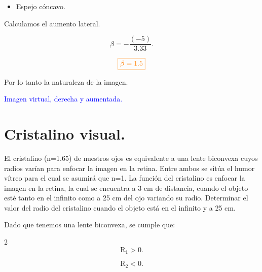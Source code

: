 \documentclass[a4paper,12pt]{article} %
\begin{document}
\vspace{\baselineskip}

\begin{itemize}
	\item Espejo cóncavo.
\end{itemize}

\begin{justify}
	Calculamos el aumento lateral.
\end{justify}

\[ \beta = -\frac{(-5)}{3.33}. \]

\[ \textcolor{orange}{\boxed{ \beta = 1.5 }}\]

\begin{justify}
	Por lo tanto la naturaleza de la imagen.
\end{justify}

\begin{justify}
	\centering
	\textcolor{blue}{Imagen virtual, derecha y aumentada.}
\end{justify}

\vspace{\baselineskip}

\section{Cristalino visual.}

\begin{justify}
	El cristalino (n=1.65) de nuestros ojos es equivalente a una lente biconvexa cuyos radios varían para 
	enfocar la imagen en la retina. Entre ambos se sitúa el humor vítreo para el cual se asumirá que n=1. 
	La función del cristalino es enfocar la imagen en la retina, la cual se encuentra a 3 cm de distancia, 
	cuando el objeto esté tanto en el infinito como a 25 cm del ojo variando su radio. 
	Determinar el valor del radio del cristalino cuando el objeto está en el infinito y a 25 cm.
\end{justify}

\vspace{\baselineskip}

\begin{justify}
	Dado que tenemos una lente biconvexa, se cumple que:
\end{justify}

\begin{multicols}{2}
	\[ \mathrm{R}_1 > 0 .\]

	\[\mathrm{R}_2 < 0. \]
\end{multicols}
\end{document}
